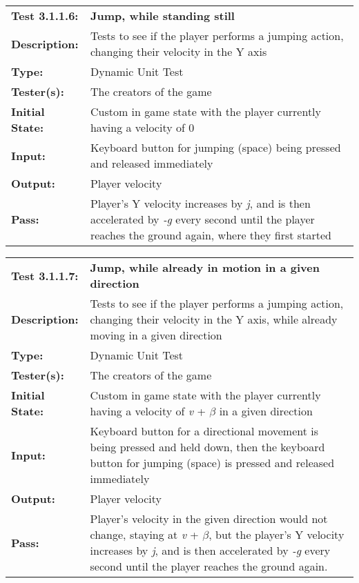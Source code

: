 \documentclass[12pt, titlepage]{article}
\begin{document}
\begin{mdframed}[linewidth=1pt]
\begin{tabularx}{\textwidth}{@{}p{3cm}X@{}}
{\bf Test 3.1.1.6:} & {\bf Jump, while standing still}\\[\baselineskip]
{\bf Description:} & Tests to see if the player performs a jumping action, changing their velocity in the Y axis\\[0.5\baselineskip]
{\bf Type:} & Dynamic Unit Test\\[0.5\baselineskip]
{\bf Tester(s):} & The creators of the game\\[0.5\baselineskip]
{\bf Initial State:} & Custom in game state with the player currently having a velocity of 0\\[0.5\baselineskip]
{\bf Input:} & Keyboard button for jumping (space) being pressed and released immediately\\[0.5\baselineskip]
{\bf Output:} & Player velocity\\[0.5\baselineskip]
{\bf Pass:} & Player's Y velocity increases by \textit{j}, and is then accelerated by \textit{-g} every second until the player reaches the ground again, where they first started
\end{tabularx}
\end{mdframed}

\begin{mdframed}[linewidth=1pt]
\begin{tabularx}{\textwidth}{@{}p{3cm}X@{}}
{\bf Test 3.1.1.7:} & {\bf Jump, while already in motion in a given direction}\\[\baselineskip]
{\bf Description:} & Tests to see if the player performs a jumping action, changing their velocity in the Y axis, while already moving in a given direction\\[0.5\baselineskip]
{\bf Type:} & Dynamic Unit Test\\[0.5\baselineskip]
{\bf Tester(s):} & The creators of the game\\[0.5\baselineskip]
{\bf Initial State:} & Custom in game state with the player currently having a velocity of \textit{v} + $\beta$ in a given direction \\[0.5\baselineskip]
{\bf Input:} & Keyboard button for a directional movement is being pressed and held down, then the keyboard button for jumping (space) is pressed and released immediately\\[0.5\baselineskip]
{\bf Output:} & Player velocity\\[0.5\baselineskip]
{\bf Pass:} & Player's velocity in the given direction would not change, staying at \textit{v} + $\beta$, but the player's Y velocity increases by \textit{j}, and is then accelerated by \textit{-g} every second until the player reaches the ground again. 
\end{tabularx}
\end{mdframed}
\end{document}
